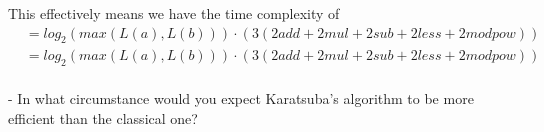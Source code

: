 \documentclass[journal,a4paper]{IEEEtran}
\begin{document}
This effectively means we have the time complexity of
\begin{align*}
	&= log_2(max(L(a),L(b)))\cdot \left( 3(2add+2mul+2sub+2less+2modpow) \right) \\
	&= log_2(max(L(a),L(b)))\cdot \left( 3(2add+2mul+2sub+2less+2modpow) \right) \\
\end{align*}

- In what circumstance would you expect Karatsuba’s algorithm to be more efficient than the classical one?
\end{document}
